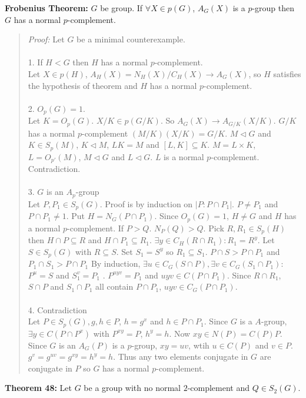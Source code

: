 {\bf Frobenius Theorem:} $G$ be group. If $\forall X \in p(G)$, $A_G(X)$ is a $p$-group then $G$ has a normal
$p$-complement.
\begin{quote}
\emph{Proof:}
Let $G$ be a minimal counterexample.
\\
\\
1. If $H < G$ then $H$ has a normal $p$-complement.
\\
Let $X \in p(H)$, $A_H(X) = N_H(X)/C_H(X) \rightarrow A_G(X)$, so $H$ satisfies the hypothesis of theorem and
$H$ has a normal $p$-complement.
\\
\\
2. $O_p(G) = 1$.
\\
Let $K = O_p(G)$.  $X/K \in p(G/K)$.  So $A_G(X) \rightarrow A_{G/K}(X/K)$.  $G/K$ has a normal $p$-complement
$(M/K) (X/K) = G/K$.  $M \lhd G$ and $K \in S_p(M)$, $K \lhd M$, $LK = M$ and $[L,K] \subseteq K$.
$M = L \times K$,
$L = O_{p'}(M)$,  $M \lhd G$ and $L \lhd G$.  $L$ is a normal $p$-complement.  Contradiction.
\\
\\
3. $G$ is an $A_p$-group
\\
Let $P, P_1 \in S_p(G)$.  Proof is by induction on $|P: P \cap P_1|$.  $P \neq P_1$ and $P \cap P_1 \neq 1$.
Put $H = N_G(P \cap P_1 )$.  Since $O_p(G) = 1$, $H \neq G$ and $H$ has a normal $p$-complement.  If $P > Q$.
$N_P(Q) > Q$.  Pick $R, R_1 \in S_p(H)$ then $H \cap P \subseteq R$ and
$H \cap P_1 \subseteq R_1$.  $\exists y \in C_H(R \cap R_1): R_1 = R^y$.  Let $S \in S_p(G)$ with $R \subseteq S$.  Set $S_1 = S^y$ so
$R_1 \subseteq S_1$.   $P \cap S > P \cap P_1$ and $P_1 \cap S_1 > P \cap P_1$
By induction, $\exists u \in C_G(S \cap P),
\exists v \in C_G(S_1 \cap P_1):$ $P^u=S$ and $S_1^v=P_1$ .  $P^{uyv} = P_1$ and $uyv \in C(P \cap P_1)$.
Since $R \cap R_1$, $S \cap P$ and $S_1 \cap P_1$ all contain $P \cap P_1$, $uyv \in C_G(P \cap P_1 )$.
\\
\\
4. Contradiction
\\
Let $P \in S_p(G), g,h \in P$, $h= g^x$ and $h \in P \cap P_1$.  Since $G$ is a $A$-group,
$\exists y \in C(P \cap P^x)$ with $P^{xy}=P$, $h^y=h$.  Now $xy \in N(P)= C(P)P$.  Since $G$ is an $A_G(P)$ is a $p$-group, $xy=uv$, wtih $u \in C(P)$ and $ v \in P$.
$g^v = g^{uv} = g^{xy} = h^y = h$.  Thus any two elements conjugate in $G$ are conjugate in $P$ so $G$ has a normal
$p$-complement.
\end{quote}
{\bf Theorem 48:} Let $G$ be a group with no normal $2$-complement and $Q \in S_2(G)$.
